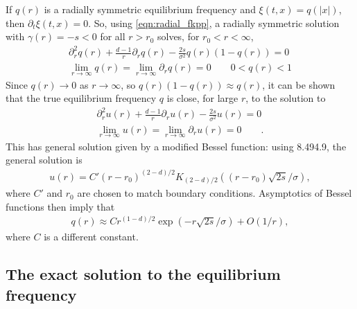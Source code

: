 \documentclass{article}
\begin{document}
If $q(r)$ is a radially symmetric equilibrium frequency and $\xi(t,x)=q(|x|)$,
then $\partial_t \xi(t,x) = 0$.
So, using \eqref{eqn:radial_fkpp}, a radially symmetric solution 
with $\gamma(r) = -s < 0$ for all $r>r_0$ 
solves, for $r_0 < r < \infty$,
\begin{align}
    \partial_r^2 q(r) + \frac{d-1}{r} \partial_r q(r) - \frac{2s}{\sigma^2} q(r) (1-q(r)) = 0 \\
    \lim_{r \to \infty} q(r) = \lim_{r \to \infty} \partial_r q(r) = 0 \qquad 
    0 < q(r) < 1 
\end{align}
Since $q(r) \to 0$ as $r \to \infty$, so $q(r) (1-q(r)) \approx q(r)$,
it can be shown 
that the true equilibrium frequency $q$ is close, for large $r$, to the solution to
\begin{align}
    \partial_r^2 u(r) + \frac{d-1}{r} \partial_r u(r) - \frac{2s}{\sigma^2} u(r) = 0  \label{eqn:bessel} \\
    \lim_{r \to \infty} u(r) = \lim_{r \to \infty} \partial_r u(r) = 0 \qquad  .
\end{align}
This has general solution given by a modified Bessel function:
using \citet{gradshteyn2007table} 8.494.9,
the general solution is
\begin{align}
    u(r) = C' (r-r_0)^{(2-d)/2} K_{(2-d)/2} \left( (r-r_0) \sqrt{2s}/\sigma \right) ,
\end{align}
where $C'$ and $r_0$ are chosen to match boundary conditions.
Asymptotics of Bessel functions \citep[][8.451.6]{gradshteyn2007table} then imply that
\begin{align}
    q(r) \approx C r^{(1-d)/2} \exp \left( -r \sqrt{2s}/\sigma \right) + O(1/r),
\end{align}
where $C$ is a different constant.



\subsection{The exact solution to the equilibrium frequency}
\label{apx:elliptic_integrals}
\end{document}
